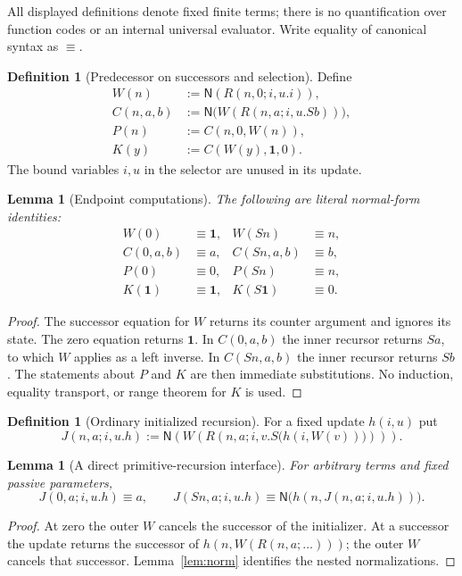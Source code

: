 \documentclass[11pt,letterpaper]{article}
\newtheorem{lemma}[theorem]{Lemma}
\theoremstyle{definition}\newtheorem{definition}[theorem]{Definition}
\theoremstyle{remark}\newtheorem{remark}[theorem]{Remark}
\newcommand{\NF}{\mathsf N}
\newcommand{\one}{\mathbf1}
\begin{document}
All displayed definitions denote fixed finite terms; there is no
quantification over function codes or an internal universal evaluator.
Write equality of canonical syntax as $\equiv$.

\begin{definition}[Predecessor on successors and selection]
Define
\begin{align}
 W(n)&:=\NF(R(n,0;i,u.i)),\label{eq:W}\\
 C(n,a,b)&:=\NF\bigl(W(R(n,a;i,u.Sb))\bigr),\label{eq:C}\\
 P(n)&:=C(n,0,W(n)),\label{eq:P}\\
 K(y)&:=C(W(y),\one,0).\label{eq:K}
\end{align}
The bound variables $i,u$ in the selector are unused in its update.
\end{definition}

\begin{lemma}[Endpoint computations]\label{lem:endpoints}
The following are literal normal-form identities:
\begin{align*}
 W(0)&\equiv\one,&W(Sn)&\equiv n,\\
 C(0,a,b)&\equiv a,&C(Sn,a,b)&\equiv b,\\
 P(0)&\equiv0,&P(Sn)&\equiv n,\\
 K(\one)&\equiv\one,&K(S\one)&\equiv0.
\end{align*}
\end{lemma}
\begin{proof}
The successor equation for $W$ returns its counter argument and ignores
its state. The zero equation returns $\one$. In $C(0,a,b)$ the inner
recursor returns $Sa$, to which $W$ applies as a left inverse. In
$C(Sn,a,b)$ the inner recursor returns $Sb$. The statements about $P$
and $K$ are then immediate substitutions. No induction, equality
transport, or range theorem for $K$ is used.
\end{proof}

\begin{definition}[Ordinary initialized recursion]\label{def:J}
For a fixed update $h(i,u)$ put
\begin{equation}\label{eq:J}
 J(n,a;i,u.h):=
 \NF\left(W\left(R(n,a;i,v.S\bigl(h(i,W(v))\bigr))\right)\right).
\end{equation}
\end{definition}

\begin{lemma}[A direct primitive-recursion interface]\label{lem:J}
For arbitrary terms and fixed passive parameters,
\[
 J(0,a;i,u.h)\equiv a,\qquad
 J(Sn,a;i,u.h)\equiv
 \NF\bigl(h(n,J(n,a;i,u.h))\bigr).
\]
\end{lemma}
\begin{proof}
At zero the outer $W$ cancels the successor of the initializer. At a
successor the update returns the successor of
$h(n,W(R(n,a;\ldots)))$; the outer $W$ cancels that successor.
Lemma~\ref{lem:norm} identifies the nested normalizations.
\end{proof}
\end{document}
